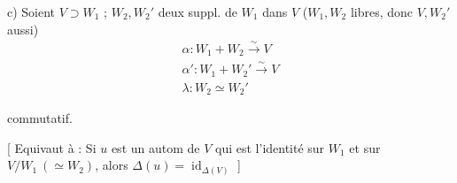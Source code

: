 c) Soient $V\supset W_1$ ; $W_2,W_2'$ deux suppl. de $W_1$ dans $V$ ($W_1,W_2$ libres, donc $V,W_2'$ aussi)
\[
\begin{array}{l}
\alpha:W_1+W_2\xrightarrow{\sim}V\\
\alpha':W_1+W_2'\xrightarrow{\sim}V\\
\lambda:W_2\simeq W_2'
\end{array}
\]

commutatif.

[ Equivaut à : Si $u$ est un autom de $V$ qui est l'identité sur $W_1$ et sur $V/W_1\ (\simeq W_2)$, alors $\Delta(u)=\operatorname{id}_{\Delta(V)}$ ]
